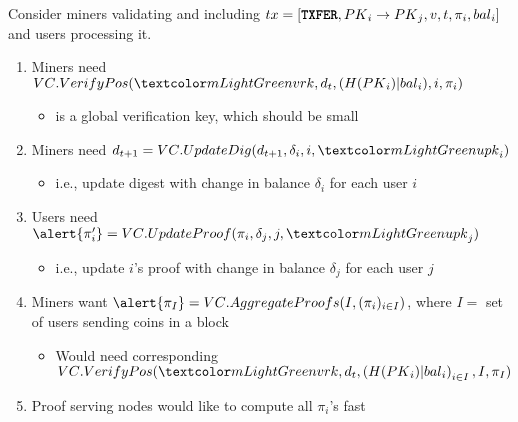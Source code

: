 \begin{frame}
    Consider miners \alert{validating} and \alert{including} ${tx} = [\texttt{\textbf{TXFER}}, {PK}_i \rightarrow {PK}_j, v, {t}, {\pi_i}, {{bal}_i}]$ \pause\xspace and users \alert{processing} it.\pause
    \begin{enumerate}
        \item Miners need $\vcverifypos(\vrk, d_t, (H(\PK_i)|\bal_i), i, \pi_i)$\pause
        \begin{itemize}
            \item \vrk is a global \alert{verification key}, which should be small\pause
        \end{itemize}
        \item Miners need $d_{t+1}=\vccommupdate(d_{t+1}, \delta_i, i, \upk_i)$\pause %
        \begin{itemize}
            \item i.e., update digest with change in balance $\delta_i$ for each user $i$\pause
        \end{itemize}
        \item Users need $\alert{\pi_i'} = \vcproofupdate(\pi_i, \delta_j, j, \upk_j)$\pause
        \begin{itemize}
            \item i.e., update $i$'s proof with change in balance $\delta_j$ for each user $j$\pause
        \end{itemize}
        \item Miners want $\alert{\pi_I} = \vcaggregateproofs(I, (\pi_i)_{i\in I})$, where $I=$ set of users sending coins in a block\pause
        \begin{itemize}
            \item Would need corresponding $\vcverifypos(\vrk, d_t, \left(H(\PK_i)|\bal_i\right)_{i\in I}, I, \pi_I)$\pause
        \end{itemize}
        \item \alert{Proof serving nodes} would like to compute all $\pi_i$'s fast
    \end{enumerate}
\end{frame}